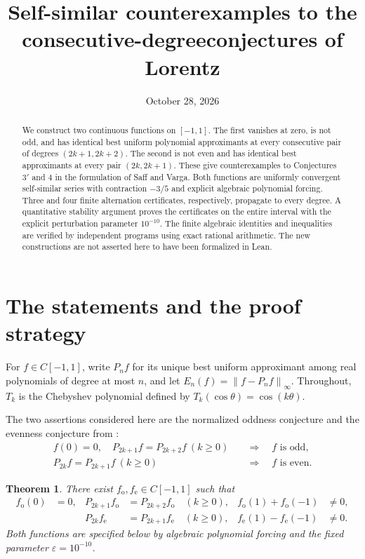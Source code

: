 \documentclass[11pt]{article}
\title{Self-similar counterexamples to the consecutive-degree\newline conjectures of Lorentz}
\author{}
\date{October 28, 2026}
\newtheorem{theorem}{Theorem}[section]
\theoremstyle{remark}\newtheorem{remark}[theorem]{Remark}
\newcommand{\norm}[1]{\left\|#1\right\|_\infty}
\newcommand{\eps}{\varepsilon}
\begin{document}
\maketitle
\begin{abstract}
We construct two continuous functions on $[-1,1]$. The first vanishes at
zero, is not odd, and has identical best uniform polynomial approximants
at every consecutive pair of degrees $(2k+1,2k+2)$. The second is not even
and has identical best approximants at every pair $(2k,2k+1)$. These give
counterexamples to Conjectures $3'$ and $4$ in the formulation of Saff and
Varga. Both functions are uniformly convergent self-similar series with
contraction $-3/5$ and explicit algebraic polynomial forcing. Three and four
finite alternation certificates, respectively, propagate to every degree.
A quantitative stability argument proves the certificates on the entire
interval with the explicit perturbation parameter $10^{-10}$. The finite
algebraic identities and inequalities are verified by independent programs
using exact rational arithmetic. The new constructions are not asserted
here to have been formalized in Lean.
\end{abstract}

\section{The statements and the proof strategy}

For $f\in C[-1,1]$, write $P_n f$ for its unique best uniform approximant
among real polynomials of degree at most $n$, and let
$E_n(f)=\norm{f-P_n f}$. Throughout, $T_k$ is the Chebyshev polynomial
defined by $T_k(\cos\theta)=\cos(k\theta)$.

The two assertions considered here are the normalized oddness conjecture
and the evenness conjecture from \cite{SaffVarga}:
\begin{align*}
 f(0)=0,\quad P_{2k+1}f=P_{2k+2}f\ (k\ge0)
 &\quad\Longrightarrow\quad f\text{ is odd},\\
 P_{2k}f=P_{2k+1}f\ (k\ge0)
 &\quad\Longrightarrow\quad f\text{ is even}.
\end{align*}

\begin{theorem}\label{thm:main}
There exist $f_{\mathrm{o}},f_{\mathrm{e}}\in C[-1,1]$ such that
\begin{align*}
 f_{\mathrm{o}}(0)&=0,&
 P_{2k+1}f_{\mathrm{o}}&=P_{2k+2}f_{\mathrm{o}}\quad(k\ge0),&
 f_{\mathrm{o}}(1)+f_{\mathrm{o}}(-1)&\ne0,\\
 &&P_{2k}f_{\mathrm{e}}&=P_{2k+1}f_{\mathrm{e}}\quad(k\ge0),&
 f_{\mathrm{e}}(1)-f_{\mathrm{e}}(-1)&\ne0.
\end{align*}
Both functions are specified below by algebraic polynomial forcing and the
fixed parameter $\eps=10^{-10}$.
\end{theorem}
\end{document}
